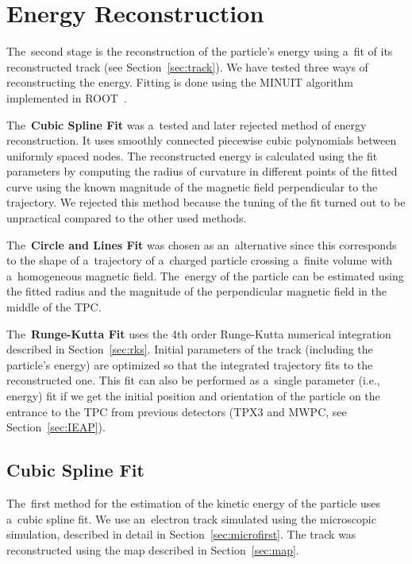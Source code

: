 \chapter{Energy Reconstruction}
\label{sec:energy}
	The~second stage is the reconstruction of the particle's energy using a~fit of its reconstructed track (see Section~\ref{sec:track}). We have tested three ways of reconstructing the energy. Fitting is done using the MINUIT algorithm implemented in ROOT~\cite{ROOT}.
	
	The~\textbf{Cubic Spline Fit} was a~tested and later rejected method of energy reconstruction. It uses smoothly connected piecewise cubic polynomials between uniformly spaced nodes. The reconstructed energy is calculated using the fit parameters by computing the radius of curvature in different points of the fitted curve using the known magnitude of the magnetic field perpendicular to the trajectory. We rejected this method because the tuning of the fit turned out to be unpractical compared to the other used methods.
	
	The~\textbf{Circle and Lines Fit} was chosen as an~alternative since this corresponds to the shape of a~trajectory of a~charged particle crossing a~finite volume with a~homogeneous magnetic field. The~energy of the particle can be estimated using the fitted radius and the magnitude of the perpendicular magnetic field in the middle of the \ac{TPC}.
	
	The~\textbf{Runge-Kutta Fit} uses the 4th order Runge-Kutta numerical integration described in Section~\ref{sec:rks}. Initial parameters of the track (including the particle's energy) are optimized so that the integrated trajectory fits to the reconstructed one. This fit can also be performed as a~single parameter (i.e., energy) fit if we get the initial position and orientation of the particle on the entrance to the \ac{TPC} from previous detectors (\ac{TPX3} and \ac{MWPC}, see Section~\ref{sec:IEAP}).
	
	\section{Cubic Spline Fit}
	\label{sec:cspline}
		The~first method for the estimation of the kinetic energy of the particle uses a~cubic spline fit. We use an~electron track simulated using the microscopic simulation, described in detail in Section~\ref{sec:microfirst}. The track was reconstructed using the map described in Section~\ref{sec:map}.
				
